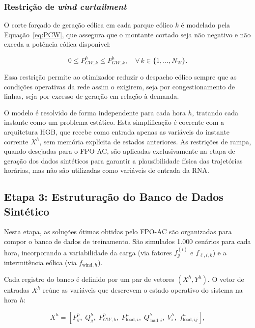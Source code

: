 \documentclass[conference]{IEEEtran}
\begin{document}
\noindent 

\subsubsection{Restrição de \textit{wind curtailment}}

O corte forçado de geração eólica em cada parque eólico $k$ é modelado pela Equação~\eqref{eq:PCW}, que assegura que o montante cortado seja não negativo e não exceda a potência eólica disponível:

\begin{equation}
0 \leq P_{CW,k}^{h} \leq P_{GW,k}^{h}, \quad \forall\, k \in \{1, \ldots, N_W\}.
\label{eq:PCW}
\end{equation}

Essa restrição permite ao otimizador reduzir o despacho eólico sempre que as condições operativas da rede assim o exigirem, seja por congestionamento de linhas, seja por excesso de geração em relação à demanda.

\noindent O modelo é resolvido de forma independente para cada hora $h$, tratando cada instante como um problema estático. Esta simplificação é coerente com a arquitetura HGB, que recebe como entrada apenas as variáveis do instante corrente $X^h$, sem memória explícita de estados anteriores. As restrições de rampa, quando desejadas para o FPO-AC, são aplicadas exclusivamente na etapa de geração dos dados sintéticos para garantir a plausibilidade física das trajetórias horárias, mas não são utilizadas como variáveis de entrada da RNA.

\subsection{Etapa 3: Estruturação do Banco de Dados Sintético}

Nesta etapa, as soluções ótimas obtidas pelo FPO-AC são organizadas para
compor o banco de dados de treinamento. São simulados 1.000 cenários para
cada hora, incorporando a variabilidade da carga (via fatores $f_g^{(i)}$
e $f_{\ell,i,k}$) e a intermitência eólica (via $f_{\text{wind},h}$).

Cada registro do banco é definido por um par de vetores $(X^h, Y^h)$.
O vetor de entradas $X^h$ reúne as variáveis que descrevem o estado
operativo do sistema na hora $h$:

\begin{equation}
X^{h} = \left[
    P_{g}^{h},\;
    Q_{g}^{h},\;
    P_{GW,k}^{h},\;
    P_{\text{load},i}^{h},\;
    Q_{\text{load},i}^{h},\;
    V_{i}^{h},\;
    f_{\text{load},ij}^{h}
\right],
\label{eq:Xh}
\end{equation}
\end{document}
